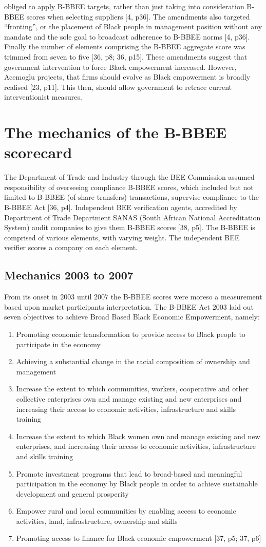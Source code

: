 obliged to apply B-BBEE targets, rather than just taking into consideration B-BBEE scores when selecting suppliers [4, p36]. The amendments also targeted “fronting”, or the placement of Black people in management position without any mandate and the sole goal to broadcast adherence to B-BBEE norms [4, p36]. Finally the number of elements comprising the B-BBEE aggregate score was trimmed from seven to five [36, p8; 36, p15]. These amendments suggest that government intervention to force Black empowerment increased. However, Acemoglu projects, that firms should evolve as Black empowerment is broadly realised [23, p11]. This then, should allow government to retrace current interventionist measures.
\section{The mechanics of the B-BBEE scorecard}
The Department of Trade and Industry through the BEE Commission assumed responsibility of overseeing compliance B-BBEE scores, which included but not limited to B-BBEE (of share transfers) transactions, supervise compliance to the B-BBEE Act [36, p4]. Independent BEE verification agents, accredited by Department of Trade Department SANAS (South African National Accreditation System) audit companies to give them B-BBEE scores [38, p5]. The B-BBEE is comprised of various elements, with varying weight. The independent BEE verifier scores a company on each element. 
\subsection{Mechanics 2003 to 2007}
From its onset in 2003 until 2007 the B-BBEE scores were moreso a measurement based upon market participants interpretation. The B-BBEE Act 2003 laid out seven objectives to achieve Broad Based Black Economic Empowerment, namely:
\begin{enumerate}
  \item Promoting economic transformation to provide access to Black people to participate in the economy
  \item Achieving a substantial change in the racial composition of ownership and management 
  \item Increase the extent to which communities, workers, cooperative and other collective enterprises own and manage existing and new enterprises and increasing their access to economic activities, infrastructure and skills training
  \item Increase the extent to which Black women own and manage existing and new enterprises, and increasing their access to economic activities, infrastructure and skills training
  \item Promote investment programs that lead to broad-based and meaningful participation in the economy by Black people in order to achieve sustainable development and general prosperity
  \item Empower rural and local communities by enabling access to economic activities, land, infrastructure, ownership and skills
  \item Promoting access to finance for Black economic empowerment [37, p5; 37, p6]
\end{enumerate}
